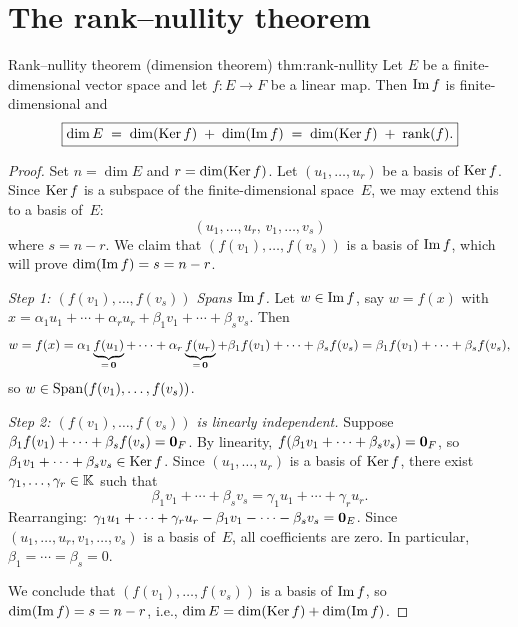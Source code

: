 \section{The rank--nullity theorem}\label{sec:rank-nullity}

\begin{theorem}{Rank--nullity theorem (dimension theorem)}%
{thm:rank-nullity}
Let $E$ be a finite-dimensional vector space and let $f\colon E\to F$
be a linear map. Then $\operatorname{Im} f$ is finite-dimensional and
\[
  \boxed{\dim E \;=\; \dim(\operatorname{Ker} f) \;+\; \dim(\operatorname{Im} f)
    \;=\; \dim(\operatorname{Ker} f) \;+\; \operatorname{rank}(f).}
\]
\end{theorem}

\begin{proof}
Set $n = \dim E$ and $r = \dim(\operatorname{Ker} f)$.
Let $(u_1,\ldots,u_r)$ be a basis of $\operatorname{Ker} f$. Since $\operatorname{Ker} f$ is a
subspace of the finite-dimensional space~$E$, we may extend this to a
basis of~$E$:
\[
  (u_1,\ldots,u_r,\, v_1,\ldots,v_s)
\]
where $s = n-r$. We claim that $(f(v_1),\ldots,f(v_s))$ is a basis
of $\operatorname{Im} f$, which will prove $\dim(\operatorname{Im} f) = s = n - r$.

\medskip
\textit{Step 1: $(f(v_1),\ldots,f(v_s))$ Spans $\operatorname{Im} f$.}\;
Let $w\in\operatorname{Im} f$, say $w = f(x)$ with
$x = \alpha_1 u_1 + \cdots + \alpha_r u_r +
\beta_1 v_1 + \cdots + \beta_s v_s$.
Then
\[
  w = f(x) = \alpha_1 \underbrace{f(u_1)}_{=\,\mathbf{0}}
  + \cdots + \alpha_r \underbrace{f(u_r)}_{=\,\mathbf{0}}
  + \beta_1 f(v_1) + \cdots + \beta_s f(v_s)
  = \beta_1 f(v_1) + \cdots + \beta_s f(v_s),
\]
so $w\in\operatorname{Span}(f(v_1),\ldots,f(v_s))$.

\medskip
\textit{Step 2: $(f(v_1),\ldots,f(v_s))$ is linearly independent.}\;
Suppose $\beta_1 f(v_1) + \cdots + \beta_s f(v_s) = \mathbf{0}_F$.
By linearity, $f(\beta_1 v_1 + \cdots + \beta_s v_s) = \mathbf{0}_F$,
so $\beta_1 v_1 + \cdots + \beta_s v_s \in \operatorname{Ker} f$.
Since $(u_1,\ldots,u_r)$ is a basis of $\operatorname{Ker} f$, there exist
$\gamma_1,\ldots,\gamma_r\in{\mathbb{K}}$ such that
\[
  \beta_1 v_1 + \cdots + \beta_s v_s
  = \gamma_1 u_1 + \cdots + \gamma_r u_r.
\]
Rearranging:
$\gamma_1 u_1 + \cdots + \gamma_r u_r
- \beta_1 v_1 - \cdots - \beta_s v_s = \mathbf{0}_E$.
Since $(u_1,\ldots,u_r,v_1,\ldots,v_s)$ is a basis of~$E$, all
coefficients are zero. In particular, $\beta_1 = \cdots = \beta_s = 0$.

\medskip
We conclude that $(f(v_1),\ldots,f(v_s))$ is a basis of $\operatorname{Im} f$,
so $\dim(\operatorname{Im} f) = s = n - r$, i.e.,
$\dim E = \dim(\operatorname{Ker} f) + \dim(\operatorname{Im} f)$.
\end{proof}

